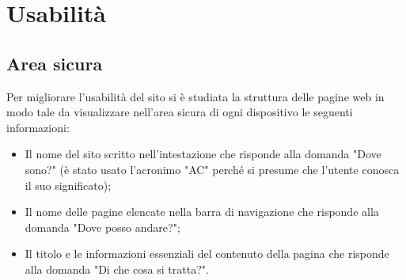 \section{Usabilità}
    \subsection{Area sicura}
    Per migliorare l'usabilità del sito si è studiata la struttura delle pagine web in modo tale da visualizzare nell'area sicura di ogni dispositivo le seguenti informazioni:
    \begin{itemize}
        \item Il nome del sito scritto nell'intestazione che risponde alla domanda "Dove sono?" (è stato usato l'acronimo "AC" perché si presume che l'utente conosca il suo significato);
        \item Il nome delle pagine elencate nella barra di navigazione che risponde alla domanda "Dove posso andare?";
        \item Il titolo e le informazioni essenziali del contenuto della pagina che risponde alla domanda "Di che cosa si tratta?".
    \end{itemize}
    
